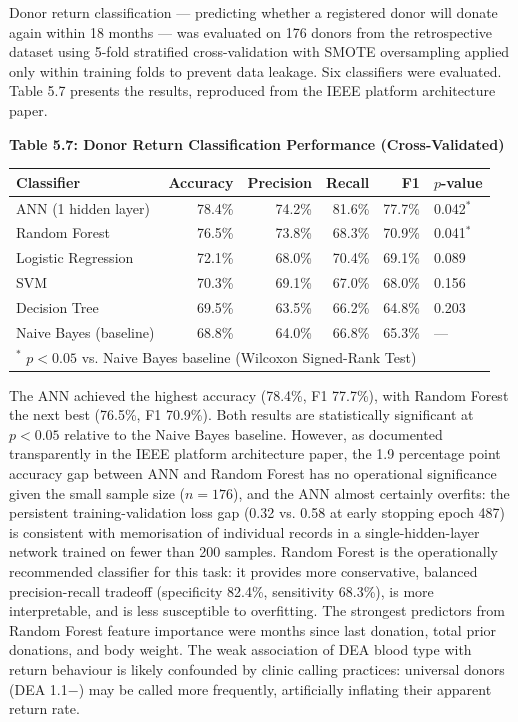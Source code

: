 \documentclass[12pt,a4paper]{article}
\begin{document}
\noindent Donor return classification — predicting whether a registered donor will donate again within 18 months — was evaluated on 176 donors from the retrospective dataset using 5-fold stratified cross-validation with SMOTE oversampling applied only within training folds to prevent data leakage. Six classifiers were evaluated. Table 5.7 presents the results, reproduced from the IEEE platform architecture paper.

\begin{center}
\textbf{Table 5.7: Donor Return Classification Performance (Cross-Validated)}
\vspace{0.4em}
\begin{tabular}{lrrrrl}
\toprule
\textbf{Classifier} & \textbf{Accuracy} & \textbf{Precision} & \textbf{Recall} & \textbf{F1} & \textbf{$p$-value} \\
\midrule
ANN (1 hidden layer) & 78.4\% & 74.2\% & 81.6\% & 77.7\% & 0.042$^*$ \\
Random Forest & 76.5\% & 73.8\% & 68.3\% & 70.9\% & 0.041$^*$ \\
Logistic Regression & 72.1\% & 68.0\% & 70.4\% & 69.1\% & 0.089 \\
SVM & 70.3\% & 69.1\% & 67.0\% & 68.0\% & 0.156 \\
Decision Tree & 69.5\% & 63.5\% & 66.2\% & 64.8\% & 0.203 \\
Naive Bayes (baseline) & 68.8\% & 64.0\% & 66.8\% & 65.3\% & — \\
\bottomrule
\multicolumn{6}{l}{$^*$ $p < 0.05$ vs. Naive Bayes baseline (Wilcoxon Signed-Rank Test)}
\end{tabular}
\end{center}

\noindent The ANN achieved the highest accuracy (78.4\%, F1 77.7\%), with Random Forest the next best (76.5\%, F1 70.9\%). Both results are statistically significant at $p < 0.05$ relative to the Naive Bayes baseline. However, as documented transparently in the IEEE platform architecture paper, the 1.9 percentage point accuracy gap between ANN and Random Forest has no operational significance given the small sample size ($n = 176$), and the ANN almost certainly overfits: the persistent training-validation loss gap (0.32 vs. 0.58 at early stopping epoch 487) is consistent with memorisation of individual records in a single-hidden-layer network trained on fewer than 200 samples. Random Forest is the operationally recommended classifier for this task: it provides more conservative, balanced precision-recall tradeoff (specificity 82.4\%, sensitivity 68.3\%), is more interpretable, and is less susceptible to overfitting. The strongest predictors from Random Forest feature importance were months since last donation, total prior donations, and body weight. The weak association of DEA blood type with return behaviour is likely confounded by clinic calling practices: universal donors (DEA 1.1$-$) may be called more frequently, artificially inflating their apparent return rate.
\end{document}
